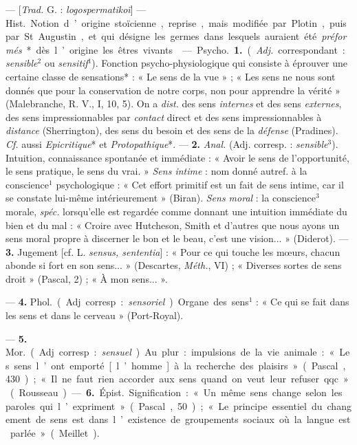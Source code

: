 \begin{itemize}[leftmargin=1cm, label=, itemsep=1pt]
 — [{\it Trad.} G. : {\it logospermatikoï}] —
\si{Hist.} Notion d’origine stoïcienne, reprise, mais modifiée par Plotin,
puis par St Augustin, et qui désigne les germes dans lesquels auraient été
{\it préformés}* dès l’origine les êtres vivants.

 — \si{Psycho.} {\bf 1.} ({\it Adj.} correspondant :
{\it sensible}$^2$ ou {\it sensitif}$^1$). Fonction psycho-physiologique qui
consiste à éprouver une certaine classe de sensations* : « Le sens de la vue
» ; « Les sens ne nous sont donnés que pour la conservation de notre corps,
non pour apprendre la vérité » (Malebranche, R. V., I, 10, 5). On a
{\it dist.} des sens {\it internes} et des sens {\it externes}, des sens
impressionnables par {\it contact} direct et des sens impressionnables à
{\it distance} (Sherrington), des sens du besoin et des sens de la
{\it défense} (Pradines). {\it Cf.} aussi {\it Epicritique}* et
{\it Protopathique}*. — {\bf 2.} {\it Anal.} (Adj. corresp. :
{\it sensible}$^3$). Intuition, connaissance spontanée et immédiate :
« Avoir le sens de l'opportunité, le sens pratique, le sens du vrai. »
{\it Sens intime} : nom donné autref. à la conscience$^1$ psychologique :
« Cet effort primitif est un fait de sens intime, car il se constate lui-même
intérieurement » (Biran). {\it Sens moral} : la conscience$^3$ morale,
{\it spéc.} lorsqu'elle est regardée comme donnant une intuition immédiate du
bien et du mal : « Croire avec Hutcheson, Smith et d'autres que nous ayons un
sens moral propre à discerner le bon et le beau, c'est une vision...
» (Diderot). —  {\bf 3.} Jugement [cf. L. {\it sensus, sententia}] : « Pour
ce qui touche les mœurs, chacun abonde si fort en son sens... » (Descartes,
{\it Méth.}, VI) ; « Diverses sortes de sens droit » (Pascal, 2) ; « À mon
sens... ».

— {\bf 4.} \si{Phol.} (Adj. corresp. : {\it sensoriel}). Organe des
sens$^1$ : « Ce qui se fait dans les sens et dans le cerveau » (Port-Royal).

— {\bf 5.} \si{Mor.} (Adj. corresp. : {\it sensuel}). Au plur. :
impulsions de la vie animale : « Les sens l’ont emporté [l’homme] à la
recherche des plaisirs » (Pascal, 430) ; «Il ne faut rien accorder aux sens
quand on veut leur refuser qqc. » (Rousseau).

— {\bf 6.} \si{Épist.} Signification : « Un même sens change selon les
paroles qui l’expriment » (Pascal, 50) ; « Le principe essentiel du
changement de sens est dans l’existence de groupements sociaux où la langue
est parlée » (Meillet).


\end{itemize}

